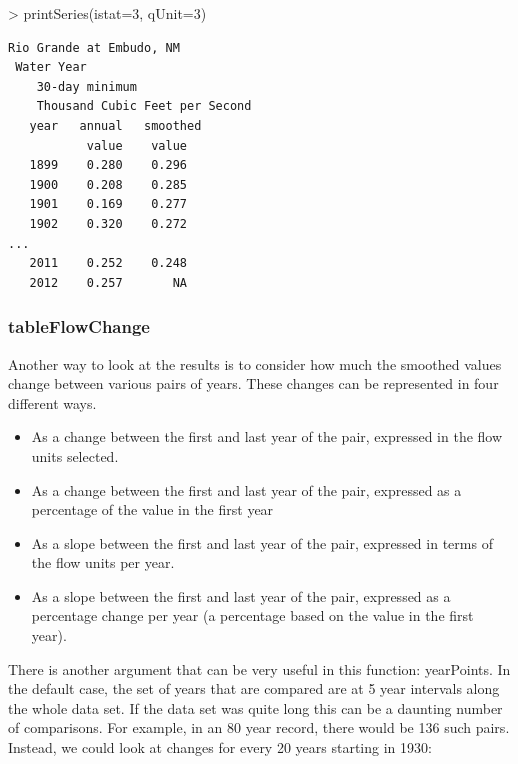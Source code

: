 \documentclass[a4paper,11pt]{article}
\begin{document}
\begin{Schunk}
\begin{Sinput}
> printSeries(istat=3, qUnit=3)
\end{Sinput}
\end{Schunk}

\begin{verbatim}
Rio Grande at Embudo, NM
 Water Year
    30-day minimum
    Thousand Cubic Feet per Second
   year   annual   smoothed
           value    value
   1899    0.280    0.296
   1900    0.208    0.285
   1901    0.169    0.277
   1902    0.320    0.272
...
   2011    0.252    0.248
   2012    0.257       NA
\end{verbatim}

\FloatBarrier
\subsubsection{tableFlowChange}
\label{sec:tableFlowChange}
Another way to look at the results is to consider how much the smoothed values change between various pairs of years.  These changes can be represented in four different ways.  
\begin{itemize}
  \item As a change between the first and last year of the pair, expressed in the flow units selected.
  \item As a change between the first and last year of the pair, expressed as a percentage of the value in the first year
  \item As a slope between the first and last year of the pair, expressed in terms of the flow units per year.
  \item As a slope between the first and last year of the pair, expressed as a percentage change per year (a percentage based on the value in the first year).
\end{itemize}

There is another argument that can be very useful in this function: yearPoints.  In the default case, the set of years that are compared are at 5 year intervals along the whole data set.  If the data set was quite long this can be a daunting number of comparisons.  For example, in an 80 year record, there would be 136 such pairs. Instead, we could look at changes for every 20 years starting in 1930: 
\end{document}
